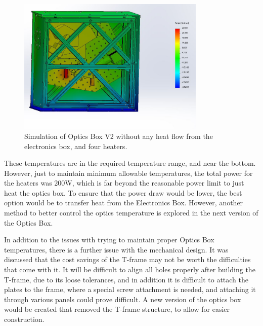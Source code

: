 \begin{figure}
    \centering
    \includegraphics[width=0.8\textwidth]{chap3_images/LIFE_V2_images/TA_-30_no_front_wall_four_heaters.JPG}
    \caption{Simulation of Optics Box V2 without any heat flow from the electronics box, and four heaters.}
    \label{fig:OB_V2_TA_4_4HEATERS}
\end{figure}

These temperatures are in the required temperature range, and near the bottom. However, just to maintain minimum allowable temperatures, the total power for the heaters was 200W, which is far beyond the reasonable power limit to just heat the optics box. To ensure that the power draw would be lower, the best option would be to transfer heat from the Electronics Box. However, another method to better control the optics temperature is explored in the next version of the Optics Box.

In addition to the issues with trying to maintain proper Optics Box temperatures, there is a further issue with the mechanical design. It was discussed that the cost savings of the T-frame may not be worth the difficulties that come with it. It will be difficult to align all holes properly after building the T-frame, due to its loose tolerances, and in addition it is difficult to attach the plates to the frame, where a special screw attachment is needed, and attaching it through various panels could prove difficult. A new version of the optics box would be created that removed the T-frame structure, to allow for easier construction.

